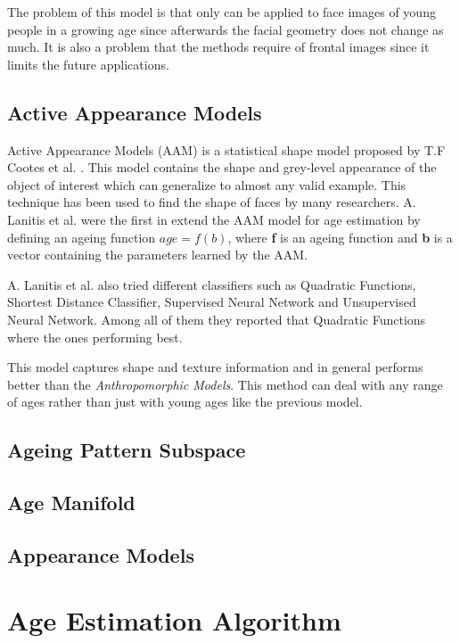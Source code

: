 The problem of this model is that only can be applied to face images of young people in a growing age since afterwards the facial geometry does not change as much. It is also a problem that the methods require of frontal images since it limits the future applications.

\subsection{Active Appearance Models}

Active Appearance Models (AAM) is a statistical shape model proposed by T.F Cootes et al. \cite{Cootes:2001:AAM:378040.378090}. This model contains the shape and grey-level appearance of the object of interest which can generalize to almost any valid example. This technique has been used to find the shape of faces by many researchers. A. Lanitis et al. \cite{791208, 993553, Lanitis:2004:CDC:2225304.2226166} were the first in extend the AAM model for age estimation by defining an ageing function $age=f(b)$, where \textbf{f} is an ageing function and \textbf{b} is a vector containing the parameters learned by the AAM.

A. Lanitis et al. \cite{Lanitis:2004:CDC:2225304.2226166} also tried different classifiers such as Quadratic Functions, Shortest Distance Classifier, Supervised Neural Network and Unsupervised Neural Network. Among all of them they reported that Quadratic Functions where the ones performing best.

This model captures shape and texture information and in general performs better than the \textit{Anthropomorphic Models}. This method can deal with any range of ages rather than just with young ages like the previous model.

\subsection{Ageing Pattern Subspace}

\subsection{Age Manifold}
\subsection{Appearance Models}
\section{Age Estimation Algorithm}
